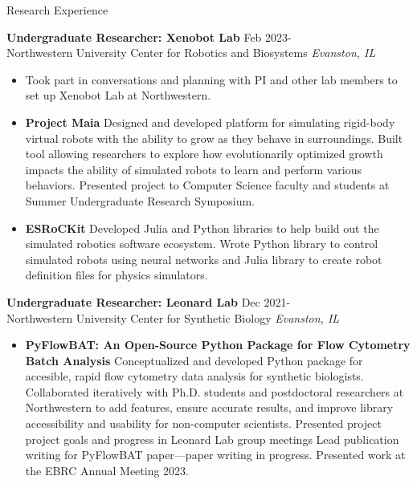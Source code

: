 \documentclass{resume} %
\begin{document}
\begin{rSection}{Research Experience}
    
    \textbf{Undergraduate Researcher: Xenobot Lab} \hfill Feb 2023- \\
     Northwestern University Center for Robotics and Biosystems \hfill \textit{Evanston, IL}
     \begin{itemize}
        \itemsep -3pt {} 
            \item[] Took part in conversations and planning with PI and other lab members to set up Xenobot Lab at Northwestern.
            \item[] \textbf{Project Maia}
            Designed and developed platform for simulating rigid-body virtual robots with the ability to grow as they behave in surroundings.
            Built tool allowing researchers to explore how evolutionarily optimized growth impacts the ability of simulated robots to learn and perform various behaviors.
            Presented project to Computer Science faculty and students at Summer Undergraduate Research Symposium.
            \item[] \textbf{ESRoCKit}
            Developed Julia and Python libraries to help build out the simulated robotics software ecosystem.
            Wrote Python library to control simulated robots using neural networks and Julia library to create robot definition files for physics simulators.
     \end{itemize}
     
     \textbf{Undergraduate Researcher: Leonard Lab} \hfill Dec 2021-\\
     Northwestern University Center for Synthetic Biology \hfill \textit{Evanston, IL}
     \begin{itemize}
        \itemsep -3pt {}
            \item[] \textbf{PyFlowBAT: An Open-Source Python Package for Flow Cytometry Batch Analysis}
            Conceptualized and developed Python package for accesible, rapid flow cytometry data analysis for synthetic biologists.
            Collaborated iteratively with Ph.D. students and postdoctoral researchers at Northwestern to add features, ensure accurate results, and improve library accessibility and usability for non-computer scientists.
            Presented project project goals and progress in Leonard Lab group meetings
            Lead publication writing for PyFlowBAT paper—paper writing in progress.
            Presented work at the EBRC Annual Meeting 2023.
     \end{itemize}


\end{rSection}
\end{document}
